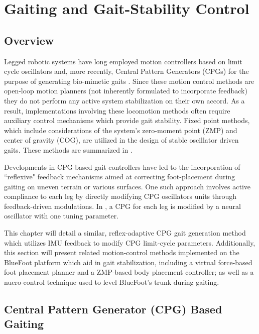 \chapter{Gaiting and Gait-Stability Control}
	\label{ch::gait_control}
	

	\section{Overview}

		Legged robotic systems have long employed motion controllers based on limit cycle oscillators and, more recently, Central Pattern Generators (CPGs)  for the purpose of generating bio-mimetic gaits \cite{Matsuoka1985,Collins1993,Endo2004,Righetti2006,Ijspeert2008,Matos2010,Ajallooeian2013,Park2014,Fukuoka2015}. Since these motion control methods are open-loop motion planners (\IE not inherently formulated to incorporate feedback) they do not perform any active system stabilization on their own accord. As a result, implementations involving these  locomotion methods often require auxiliary control mechanisms which provide gait stability. Fixed point methods, which include considerations of the system's zero-moment point (ZMP) and center of gravity (COG), are utilized in the design of stable oscillator driven gaits. These methods are summarized in \cite{Wieber2015}. %

		Developments in CPG-based gait controllers have led to the incorporation of ``reflexive" feedback mechanisms aimed at correcting foot-placement during gaiting on uneven terrain or various surfaces. One such approach involves active compliance to each leg by directly modifying CPG oscillators units through feedback-driven modulations. In \cite{Fukuoka2003,Endo2004}, a CPG for each leg is modified by a neural oscillator with one tuning parameter. 

		This chapter will detail a similar, reflex-adaptive CPG gait generation method which utilizes IMU feedback to modify CPG limit-cycle parameters. Additionally, this section will present related motion-control methods implemented on the BlueFoot platform which aid in gait stabilization, including a virtual force-based foot placement planner and a ZMP-based body placement controller; as well as a nuero-control technique used to level BlueFoot's trunk during gaiting.




	\section{Central Pattern Generator (CPG) Based Gaiting}

